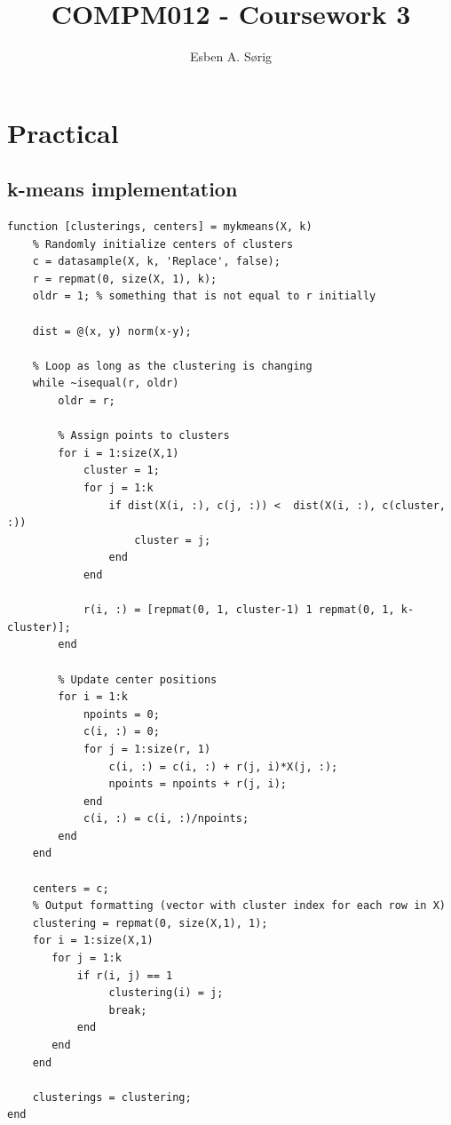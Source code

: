 \documentclass[11pt]{article}
\begin{document}
\lstset{language=Matlab}

\title{COMPM012 - Coursework 3}
\author{Esben A. S\o rig}

\maketitle

\section{Practical}

\subsection{k-means implementation}
    \begin{lstlisting}
function [clusterings, centers] = mykmeans(X, k)
    % Randomly initialize centers of clusters
    c = datasample(X, k, 'Replace', false);
    r = repmat(0, size(X, 1), k);
    oldr = 1; % something that is not equal to r initially
    
    dist = @(x, y) norm(x-y);
    
    % Loop as long as the clustering is changing
    while ~isequal(r, oldr)
        oldr = r;
        
        % Assign points to clusters
        for i = 1:size(X,1)
            cluster = 1;
            for j = 1:k
                if dist(X(i, :), c(j, :)) <  dist(X(i, :), c(cluster, :))
                    cluster = j;
                end
            end

            r(i, :) = [repmat(0, 1, cluster-1) 1 repmat(0, 1, k-cluster)];
        end

        % Update center positions
        for i = 1:k
            npoints = 0;
            c(i, :) = 0;
            for j = 1:size(r, 1)
                c(i, :) = c(i, :) + r(j, i)*X(j, :);
                npoints = npoints + r(j, i);
            end
            c(i, :) = c(i, :)/npoints;
        end
    end
    
    centers = c;
    % Output formatting (vector with cluster index for each row in X)
    clustering = repmat(0, size(X,1), 1);
    for i = 1:size(X,1)
       for j = 1:k
           if r(i, j) == 1
                clustering(i) = j;
                break;
           end
       end
    end
   
    clusterings = clustering;
end\end{lstlisting}
\end{document}

